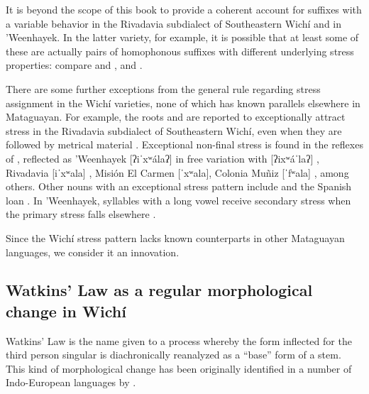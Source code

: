 \newpage
It is beyond the scope of this book to provide a coherent account for suffixes with a variable behavior in the Rivadavia subdialect of Southeastern Wichí and in ’Weenhayek. In the latter variety, for example, it is possible that at least some of these are actually pairs of homophonous suffixes with different underlying stress properties: compare  and ,  and  \citep[18]{KCnd}.

There are some further exceptions from the general rule regarding stress assignment in the Wichí varieties, none of which has known parallels elsewhere in Mataguayan. For example, the roots  and  are reported to exceptionally attract stress in the Rivadavia subdialect of Southeastern Wichí, even when they are followed by metrical material \citep[56]{JT09-th}. Exceptional non-final stress is found in the reflexes of , reflected as ’Weenhayek [ʔiˈxʷálaʔ] in free variation with [ʔixʷáˈlaʔ] \citep[25]{KC16}, Rivadavia [iˈxʷala] \citep[36]{JT09-th}, Misión El Carmen [ˈxʷala], Colonia Muñiz [ˈfʷala] \citep[138]{MC09}, among others. Other nouns with an exceptional stress pattern include  and the Spanish loan  \citep[19, fn. 16]{KCnd}. In ’Weenhayek, syllables with a long vowel receive secondary stress when the primary stress falls elsewhere \citep[20, 25]{KCnd}.

Since the Wichí stress pattern lacks known counterparts in other Mataguayan languages, we consider it an innovation.

\subsection{Watkins' Law as a regular morphological change in Wichí} \label{wi-watkins}
\largerpage[-1]

Watkins’ Law is the name given to a process whereby the form inflected for the third person singular is diachronically reanalyzed as a ``base'' form of a stem. This kind of morphological change has been originally identified in a number of Indo-European languages by \citet[90–96]{CW62}.

